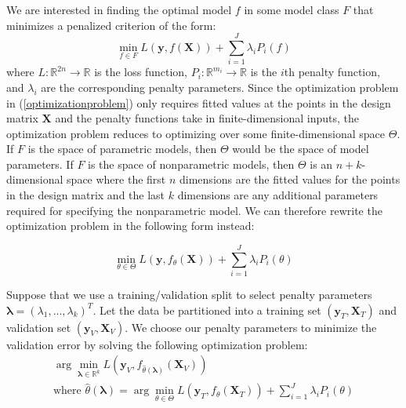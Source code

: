 \documentclass[10pt,letterpaper]{article}
\begin{document}
We are interested in finding the optimal model $f$ in some model class $F$ that minimizes a penalized criterion of the form:
\begin{equation}
\min_{f \in F} L(\boldsymbol{y}, f(\boldsymbol{X})) + \sum\limits_{i=1}^J \lambda_i P_i(f)
\label{optimizationproblem}
\end{equation}
where $L:\mathbb{R}^{2n} \rightarrow \mathbb{R}$ is the loss function, $P_i:\mathbb{R}^{m_i} \rightarrow \mathbb{R}$ is the $i$th penalty function, and $\lambda_i$ are the corresponding penalty parameters. Since the optimization problem in (\ref{optimizationproblem}) only requires fitted values at the points in the design matrix $\boldsymbol{X}$ and the penalty functions take in finite-dimensional inputs, the optimization problem reduces to optimizing over some finite-dimensional space $\Theta$. If $F$ is the space of parametric models, then $\Theta$ would be the space of model parameters. If $F$ is the space of nonparametric models, then $\Theta$ is an $n+k$-dimensional space where the first $n$ dimensions are the fitted values for the points in the design matrix and the last $k$ dimensions are any additional parameters required for specifying the nonparametric model. We can therefore rewrite the optimization problem in the following form instead:

\begin{equation}
\min_{\theta \in \Theta} L(\boldsymbol{y}, f_\theta(\boldsymbol{X})) + \sum\limits_{i=1}^J \lambda_i P_i(\theta)
\end{equation}

Suppose that we use a training/validation split to select penalty parameters $\boldsymbol{\lambda} = (\lambda_1, ..., \lambda_k)^T$. Let the data be partitioned into a training set $(\boldsymbol{y}_T , \boldsymbol{X}_T)$ and validation set $(\boldsymbol{y}_V, \boldsymbol{X}_V)$. We choose our penalty parameters to minimize the validation error by solving the following optimization problem:
\begin{equation}
\begin{array}{c}
\arg \min_{\boldsymbol{\lambda} \in \mathbb{R}^k} L(\boldsymbol{y}_V, f_{\hat{\theta}(\boldsymbol{\lambda})}(\boldsymbol{X}_V)) \\
\text{where } {\hat{\theta}(\boldsymbol{\lambda})} = \arg \min_{\theta \in \Theta} L(\boldsymbol{y}_T, f_\theta (\boldsymbol{X}_T)) + \sum\limits_{i=1}^J \lambda_i P_i(\theta)
\end{array}
\label{jointopt2}
\end{equation}
\end{document}
